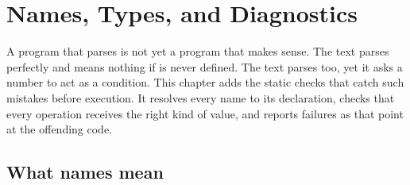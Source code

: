 \chapter{Names, Types, and Diagnostics}
\label{ch:names-types-diagnostics}

A program that parses is not yet a program that makes sense.
The text  parses perfectly and means nothing if  is never defined.
The text  parses too, yet it asks a number to act as a condition.
This chapter adds the static checks that catch such mistakes before execution.
It resolves every name to its declaration, checks that every operation receives the right kind of value, and reports failures as  that point at the offending code.

\section{What names mean}
\label{sec:ch05-what-names-mean}

